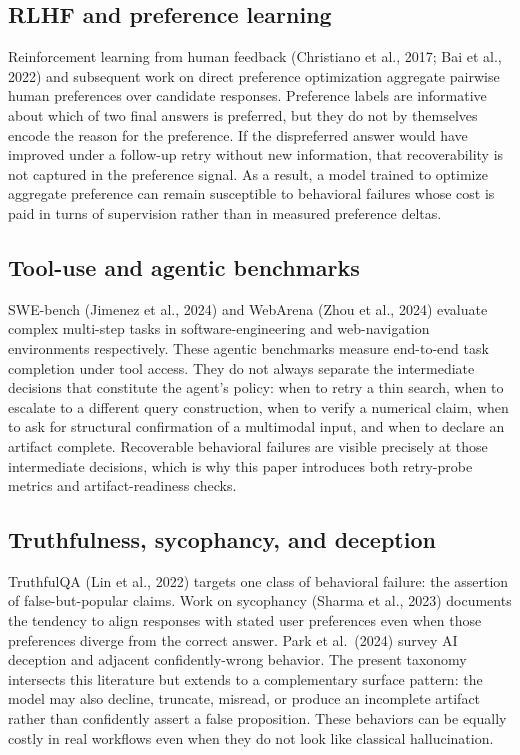 \documentclass[11pt]{article}
\begin{document}
\subsection{RLHF and preference learning}
Reinforcement learning from human feedback (Christiano et al., 2017; Bai et al., 2022) and subsequent work on direct preference optimization aggregate pairwise human preferences over candidate responses. Preference labels are informative about which of two final answers is preferred, but they do not by themselves encode the reason for the preference. If the dispreferred answer would have improved under a follow-up retry without new information, that recoverability is not captured in the preference signal. As a result, a model trained to optimize aggregate preference can remain susceptible to behavioral failures whose cost is paid in turns of supervision rather than in measured preference deltas.

\subsection{Tool-use and agentic benchmarks}
SWE-bench (Jimenez et al., 2024) and WebArena (Zhou et al., 2024) evaluate complex multi-step tasks in software-engineering and web-navigation environments respectively. These agentic benchmarks measure end-to-end task completion under tool access. They do not always separate the intermediate decisions that constitute the agent's policy: when to retry a thin search, when to escalate to a different query construction, when to verify a numerical claim, when to ask for structural confirmation of a multimodal input, and when to declare an artifact complete. Recoverable behavioral failures are visible precisely at those intermediate decisions, which is why this paper introduces both retry-probe metrics and artifact-readiness checks.

\subsection{Truthfulness, sycophancy, and deception}
TruthfulQA (Lin et al., 2022) targets one class of behavioral failure: the assertion of false-but-popular claims. Work on sycophancy (Sharma et al., 2023) documents the tendency to align responses with stated user preferences even when those preferences diverge from the correct answer. Park et al.\ (2024) survey AI deception and adjacent confidently-wrong behavior. The present taxonomy intersects this literature but extends to a complementary surface pattern: the model may also decline, truncate, misread, or produce an incomplete artifact rather than confidently assert a false proposition. These behaviors can be equally costly in real workflows even when they do not look like classical hallucination.
\end{document}
